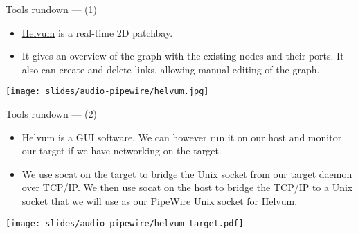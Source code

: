 \begin{frame}{Tools rundown —  (1)}
  \begin{itemize}

  \item \href{https://gitlab.freedesktop.org/pipewire/helvum}{Helvum}
    is a real-time 2D patchbay.

  \item It gives an overview of the graph with the existing nodes and
    their ports. It also can create and delete links, allowing manual
    editing of the graph.

  \end{itemize}

  \begin{center}
    \texttt{[image: slides/audio-pipewire/helvum.jpg]}
  \end{center}
\end{frame}



\begin{frame}{Tools rundown —  (2)}
  \begin{itemize}

  \item Helvum is a GUI software. We can however run it on our host and
    monitor our target if we have networking on the target.

  \item We use \href{http://www.dest-unreach.org/socat/}{socat} on the
    target to bridge the Unix socket from our target daemon over
    TCP/IP. We then use socat on the host to bridge the TCP/IP to a
    Unix socket that we will use as our PipeWire Unix socket for
    Helvum.

  \end{itemize}

  \begin{center}
    \texttt{[image: slides/audio-pipewire/helvum-target.pdf]}
  \end{center}

\end{frame}



